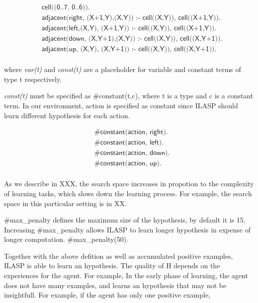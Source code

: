 \begin{equation}
\begin{split}
&\textsf{cell((0..7, 0..6)).}\\
&\textsf{adjacent(right, (X+1,Y),(X,Y)) :- cell((X,Y)), cell((X+1,Y)).} \\
&\textsf{adjacent(left,(X,Y),  (X+1,Y)) :- cell((X,Y)), cell((X+1,Y)).} \\
&\textsf{adjacent(down, (X,Y+1),(X,Y)) :- cell((X,Y)), cell((X,Y+1)).} \\
&\textsf{adjacent(up,   (X,Y),  (X,Y+1)) :- cell((X,Y)), cell((X,Y+1)).} \\
\end{split}
\end{equation}

where \textit{var(t)} and \textit{const(t)} are a placeholder for variable and constant terms of type t respectively.

\textit{const(t)} must be specified as \#constant(t,c), where t is a type and c is a constant term. 
In our environment, action is specified as constant since ILASP should learn different hypothesis for each action.

\begin{equation}
\begin{split}
&\textsf{\#constant(action, right).}\\
&\textsf{\#constant(action, left).}\\
&\textsf{\#constant(action, down).}\\
&\textsf{\#constant(action, up).}\\
\end{split}
\end{equation}

As we describe in XXX, the search space increases in propotion to the complexity of learning tasks, which slows down the learning process.
For example, the search space in this particular setting is in XX. 

\#max\_penalty defines the maximum size of the hypothesis, by default it is 15. 
Increasing \#max\_penalty allows ILASP to learn longer hypothesis in expense of longer computation.
\#max\_penalty(50).

Together with the above defition as well as accumulated positive examples, ILASP is able to learn an hypothesis. The quality of H depends on the experiences for the agent. 
For example, In the early phase of learning, the agent does not have many examples, and learns an hypothesis that may not be insightfull. 
For example, if the agent has only one positive example, 

